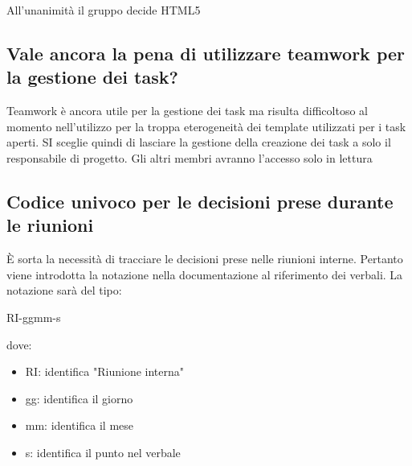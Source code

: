 \documentclass[11pt]{meetingmins}
\begin{document}
All'unanimità il gruppo decide HTML5

\subsection{Vale ancora la pena di utilizzare teamwork per la gestione dei task?}

Teamwork è ancora utile per la gestione dei task ma risulta difficoltoso al momento nell'utilizzo per la troppa eterogeneità  dei template utilizzati per i task aperti. SI sceglie quindi di lasciare la gestione della creazione dei task a solo il responsabile di progetto. Gli altri membri avranno l'accesso solo in lettura

\subsection{Codice univoco per le decisioni prese durante le riunioni}
È sorta la necessità di tracciare le decisioni prese nelle riunioni interne. Pertanto viene introdotta la notazione nella documentazione al riferimento dei verbali. La notazione sarà del tipo:

RI-ggmm-s

dove: 
\begin{itemize}
\item RI: identifica "Riunione interna" 
\item gg: identifica il giorno
\item mm: identifica il mese
\item s: identifica il punto nel verbale
\end{itemize}

\end{document}
